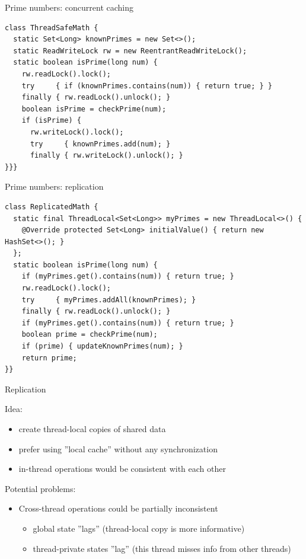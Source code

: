 \begin{frame}{Prime numbers: concurrent caching}

\begin{verbatim}
class ThreadSafeMath {
  static Set<Long> knownPrimes = new Set<>();
  static ReadWriteLock rw = new ReentrantReadWriteLock();
  static boolean isPrime(long num) {
    rw.readLock().lock();
    try     { if (knownPrimes.contains(num)) { return true; } } 
    finally { rw.readLock().unlock(); }
    boolean isPrime = checkPrime(num);
    if (isPrime) {
      rw.writeLock().lock();
      try     { knownPrimes.add(num); } 
      finally { rw.writeLock().unlock(); }
}}}
\end{verbatim}
\end{frame}

\begin{frame}{Prime numbers: replication}
\begin{verbatim}
class ReplicatedMath {
  static final ThreadLocal<Set<Long>> myPrimes = new ThreadLocal<>() {
    @Override protected Set<Long> initialValue() { return new HashSet<>(); }
  };
  static boolean isPrime(long num) {
    if (myPrimes.get().contains(num)) { return true; }
    rw.readLock().lock();
    try     { myPrimes.addAll(knownPrimes); } 
    finally { rw.readLock().unlock(); }
    if (myPrimes.get().contains(num)) { return true; }
    boolean prime = checkPrime(num);
    if (prime) { updateKnownPrimes(num); }
    return prime;
}}
\end{verbatim}
\end{frame}

\begin{frame}[fragile]{Replication}

Idea: 
\begin{itemize}
    \item create thread-local copies of shared data
    \item prefer using ''local cache'' without any synchronization
    \item in-thread operations would be consistent with each other
\end{itemize}

Potential problems:
\begin{itemize}
    \item Cross-thread operations could be partially inconsistent 
    \begin{itemize}
      \item global state ''lags'' (thread-local copy is more informative)
      \item thread-private states ''lag'' (this thread misses info from other threads)
    \end{itemize}    
\end{itemize}

\end{frame}

